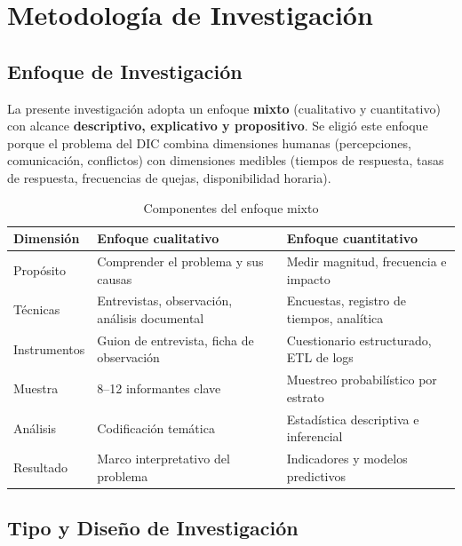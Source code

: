 \chapter{Metodología de Investigación}
\label{ch:metodologia}

\section{Enfoque de Investigación}

La presente investigación adopta un enfoque \textbf{mixto} (cualitativo y
cuantitativo) con alcance \textbf{descriptivo, explicativo y propositivo}. Se
eligió este enfoque porque el problema del \ac{DIC} combina dimensiones humanas
(percepciones, comunicación, conflictos) con dimensiones medibles (tiempos de
respuesta, tasas de respuesta, frecuencias de quejas, disponibilidad horaria).

\begin{table}[H]
\centering
\caption{Componentes del enfoque mixto}
\label{tab:enfoque-mixto}
\begin{tabularx}{\textwidth}{@{}l X X@{}}
\toprule
\rowcolor{azulClaro}
\textbf{Dimensión} & \textbf{Enfoque cualitativo} & \textbf{Enfoque cuantitativo} \\
\midrule
Propósito & Comprender el problema y sus causas & Medir magnitud, frecuencia e impacto \\
Técnicas & Entrevistas, observación, análisis documental & Encuestas, registro de tiempos, analítica \\
Instrumentos & Guion de entrevista, ficha de observación & Cuestionario estructurado, \ac{ETL} de logs \\
Muestra & 8--12 informantes clave & Muestreo probabilístico por estrato \\
Análisis & Codificación temática & Estadística descriptiva e inferencial \\
Resultado & Marco interpretativo del problema & Indicadores y modelos predictivos \\
\bottomrule
\end{tabularx}
\end{table}

\section{Tipo y Diseño de Investigación}

